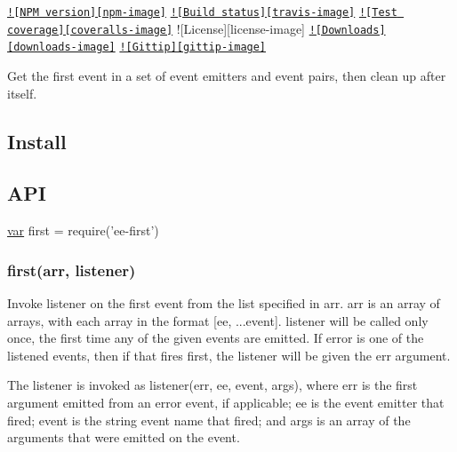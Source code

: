 \href{https://npmjs.org/package/ee-first}{\tt !\mbox{[}N\+P\+M version\mbox{]}\mbox{[}npm-\/image\mbox{]}} \href{https://travis-ci.org/jonathanong/ee-first}{\tt !\mbox{[}Build status\mbox{]}\mbox{[}travis-\/image\mbox{]}} \href{https://coveralls.io/r/jonathanong/ee-first?branch=master}{\tt !\mbox{[}Test coverage\mbox{]}\mbox{[}coveralls-\/image\mbox{]}} !\mbox{[}License\mbox{]}\mbox{[}license-\/image\mbox{]} \href{https://npmjs.org/package/ee-first}{\tt !\mbox{[}Downloads\mbox{]}\mbox{[}downloads-\/image\mbox{]}} \href{https://www.gittip.com/jonathanong/}{\tt !\mbox{[}Gittip\mbox{]}\mbox{[}gittip-\/image\mbox{]}}

Get the first event in a set of event emitters and event pairs, then clean up after itself.

\subsection*{Install}




\subsection*{A\+P\+I}


\begin{DoxyCode}
\hyperlink{018__def_8c_a335628f2e9085305224b4f9cc6e95ed5}{var} first = require(\textcolor{stringliteral}{'ee-first'})
\end{DoxyCode}


\subsubsection*{first(arr, listener)}

Invoke {\ttfamily listener} on the first event from the list specified in {\ttfamily arr}. {\ttfamily arr} is an array of arrays, with each array in the format {\ttfamily \mbox{[}ee, ...event\mbox{]}}. {\ttfamily listener} will be called only once, the first time any of the given events are emitted. If {\ttfamily error} is one of the listened events, then if that fires first, the {\ttfamily listener} will be given the {\ttfamily err} argument.

The {\ttfamily listener} is invoked as {\ttfamily listener(err, ee, event, args)}, where {\ttfamily err} is the first argument emitted from an {\ttfamily error} event, if applicable; {\ttfamily ee} is the event emitter that fired; {\ttfamily event} is the string event name that fired; and {\ttfamily args} is an array of the arguments that were emitted on the event.


